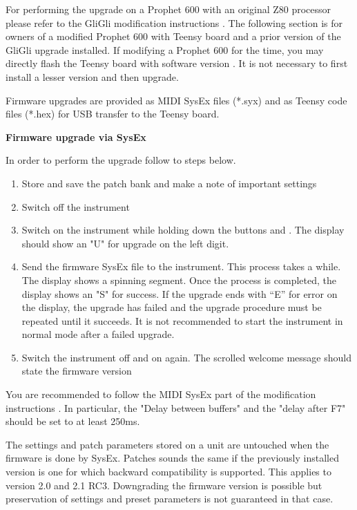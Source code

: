 For performing the upgrade on a Prophet 600 with an original Z80 processor please refer to the GliGli modification instructions \cite{modinstructions}. The following section is for owners of a modified Prophet 600 with Teensy board and a prior version of the GliGli upgrade installed. If modifying a Prophet 600 for the time, you may directly flash the Teensy board with software version \version. It is not necessary to first install a lesser version and then upgrade.

Firmware upgrades are provided as MIDI SysEx files (*.syx) and as Teensy code files (*.hex) for USB transfer to the Teensy board. 

\textbf{Firmware upgrade via SysEx}

In order to perform the upgrade follow to steps below.

\begin{enumerate}
  \setlength\itemsep{0cm}
  \item Store and save the patch bank and make a note of important settings
  \item Switch off the instrument
  \item Switch on the instrument while holding down the buttons \totape and \fromtape. The display should show an "U" for upgrade on the left digit.
  \item Send the firmware SysEx file to the instrument. This process takes a while. The display shows a spinning segment. Once the process is completed, the display shows an "S" for success. If the upgrade ends with “E” for error on the display, the upgrade has failed and the upgrade procedure must be repeated until it succeeds. It is not recommended to start the instrument in normal mode after a failed upgrade.
  \item Switch the instrument off and on again. The scrolled welcome message should state the firmware version 
\end{enumerate}

You are recommended to follow the MIDI SysEx part of the modification instructions \cite{modinstructions}. In particular, the "Delay between buffers" and the "delay after F7" should be set to at least 250ms.

The settings and patch parameters stored on a unit are untouched when the firmware is done by SysEx. Patches sounds the same if the previously installed version is one for which backward compatibility is supported. This applies to version 2.0 and 2.1 RC3. Downgrading the firmware version is possible but preservation of settings and preset parameters is not guaranteed in that case.

